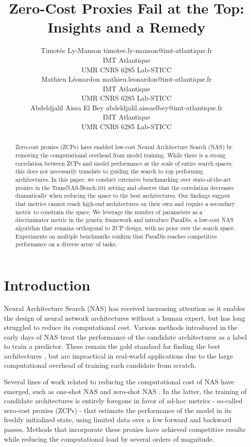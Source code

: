 \documentclass[10pt]{article} %
\title{Zero-Cost Proxies Fail at the Top: Insights and a Remedy}
\author{\name Timotée Ly-Manson \email timotee.ly-manson@imt-atlantique.fr \\
        \addr IMT Atlantique\\
        UMR CNRS 6285 Lab-STICC\\
      \AND
      \name Mathieu Léonardon \email mathieu.leonardon@imt-atlantique.fr \\
      \addr IMT Atlantique\\
        UMR CNRS 6285 Lab-STICC\\
      \AND
      \name Abdeldjalil Aissa El Bey \email abdeldjalil.aissaelbey@imt-atlantique.fr\\
      \addr IMT Atlantique\\
        UMR CNRS 6285 Lab-STICC\\
}
\begin{document}
\maketitle

\begin{abstract}
Zero-cost proxies (ZCPs) have enabled low-cost Neural Architecture Search (NAS) by removing the computational overhead from model training. While there is a strong correlation between ZCPs and model performance at the scale of entire search spaces, this does not necessarily translate to guiding the search to top performing architectures. In this paper, we conduct extensive benchmarking over state-of-the-art proxies in the TransNAS-Bench-101 setting and observe that the correlation decreases dramatically when reducing the space to the best architectures. Our findings suggest that metrics cannot reach high-end architectures on their own and require a secondary metric to constrain the space. We leverage the number of parameters as a discriminator metric in the genetic framework and introduce ParaDis, a low-cost NAS algorithm that remains orthogonal to ZCP design, with no prior over the search space. Experiments on multiple benchmarks confirm that ParaDis reaches competitive performance on a diverse array of tasks.
\end{abstract}

\section{Introduction}
\label{intro}

Neural Architecture Search (NAS) has received increasing attention as it enables the design of neural network architectures without a human expert, but has long struggled to reduce its computational cost. Various methods introduced in the early days of NAS \citep{zoph2017neural, liu2018progressive} treat the performance of the candidate architectures as a label to train a predictor. These remain the gold standard for finding the best architectures \citep{white2021bananas, schrodi2023construction}, but are impractical in real-world applications due to the large computational overhead of training each candidate from scratch.

Several lines of work related to reducing the computational cost of NAS have emerged, such as one-shot NAS \citep{pham2018efficient, guo2020single, chu2021fairnas, liu2018darts} and zero-shot NAS \citep{mellor2021neural, abdelfattah2021zero}. In the latter, the training of candidate architectures is entirely foregone in favor of ad-hoc metrics - so-called zero-cost proxies (ZCPs) - that estimate the performance of the model in its freshly initialized state, using limited data over a few forward and backward passes. Methods that incorporate these proxies have achieved competitive results \citep{jiang2023meco, peng2024swap} while reducing the computational load by several orders of magnitude.
\end{document}
